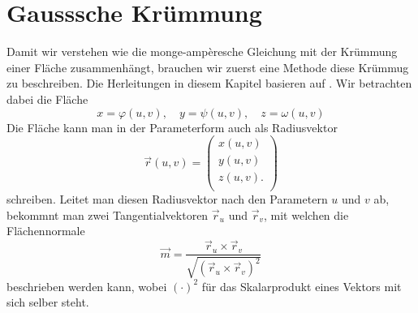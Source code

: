 %
%
%
%
\section{Gausssche Krümmung
\label{mongeampere:section:teil1}}
Damit wir verstehen wie die monge-ampèresche Gleichung mit der 
Krümmung einer Fläche zusammenhängt, brauchen wir zuerst eine Methode diese 
Krümmug zu beschreiben.
Die Herleitungen in diesem Kapitel basieren auf \cite{mongeampere:smirnow}.
Wir betrachten dabei die Fläche
\begin{equation}
  x = \varphi(u,v), \quad y = \psi(u,v), \quad z = \omega(u,v)
  \label{mongeampere:areaparam}
\end{equation}
Die Fläche kann man in der Parameterform auch als Radiusvektor
\begin{equation}
  \vec r (u, v) =
  \begin{pmatrix}
    x(u,v) \\
    y(u,v) \\
    z(u,v). \\
  \end{pmatrix}
  \label{mongeampere:rad}
\end{equation}
schreiben.
Leitet man diesen Radiusvektor nach den Parametern $u$ und $v$ ab, bekommnt man zwei Tangentialvektoren
$\vec r_u$ und $\vec r_v$,
mit welchen die Flächennormale 
\begin{equation}
  \vec m = \frac{\vec r_u \times \vec r_v}{\sqrt{(\vec r_u \times \vec r_v)^2}} 
  \label{mongeampere:norm}
\end{equation}
beschrieben werden kann, wobei $(\cdot)^2$ für das Skalarprodukt eines Vektors mit sich selber steht.

